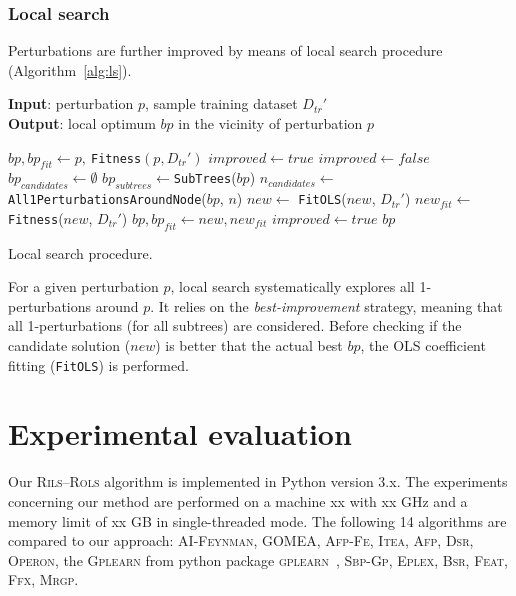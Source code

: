 \documentclass[a4paper,12pt]{elsarticle}
\begin{document}

\subsubsection{Local search}\label{sec:ls}

Perturbations are further improved by means of local search procedure (Algorithm~\ref{alg:ls}). 

\begin{algorithm}
	\hspace*{\algorithmicindent} \textbf{Input}: perturbation $p$, sample training dataset $D_{tr}'$ \\
	\hspace*{\algorithmicindent} \textbf{Output}: local optimum $bp$ in the vicinity of perturbation $p$
	\begin{algorithmic}[1] 
		\State $bp, bp_{fit} \gets p,\ $\texttt{Fitness}$(p,D_{tr}')$ 
		\State $improved \gets true$
		\State $improved \gets false$
		\State $bp_{candidates} \gets \emptyset$
		\State $bp_{subtrees} \gets $\texttt{SubTrees}($bp$)
		\State $n_{candidates} \gets $ \texttt{All1PerturbationsAroundNode}($bp$, $n$)
		\State $new \gets$ \texttt{FitOLS}($new$, $D_{tr}'$)
		\State $new_{fit} \gets$ \texttt{Fitness}($new$, $D_{tr}'$)
		\State $bp, bp_{fit} \gets new, new_{fit}$
		\State $improved \gets true$
		\EndIf
		\EndFor
		\EndFor
		\EndWhile
		\State \Return $bp$
		\EndProcedure
	\end{algorithmic}
	\caption{Local search procedure.}
	\label{alg:ls}
\end{algorithm}  

For a given perturbation $p$, local search systematically explores all 1-perturbations around $p$. It relies on the \emph{best-improvement} strategy, meaning that all 1-perturbations (for all subtrees) are considered. Before checking if the candidate solution ($new$) is better that the actual best $bp$, the OLS coefficient fitting (\texttt{FitOLS}) is performed. 

\section{Experimental evaluation}\label{sec:experiments}

Our \textsc{Rils}--\textsc{Rols} algorithm is implemented in Python version 3.x. The experiments concerning our method are performed on a machine xx with xx GHz and a memory limit of xx GB in single-threaded mode.  
The following 14 algorithms are compared to our approach: \textsc{AI-Feynman}, \textsc{GOMEA}, \textsc{Afp-Fe}, \textsc{Itea}, \textsc{Afp}, \textsc{Dsr}, \textsc{Operon}, the \textsc{Gplearn} from python package \textsc{gplearn}~\cite{stephens2016genetic}, \textsc{Sbp-Gp}, \textsc{Eplex}, \textsc{Bsr}, \textsc{Feat}, \textsc{Ffx}, \textsc{Mrgp}. 
\end{document}
